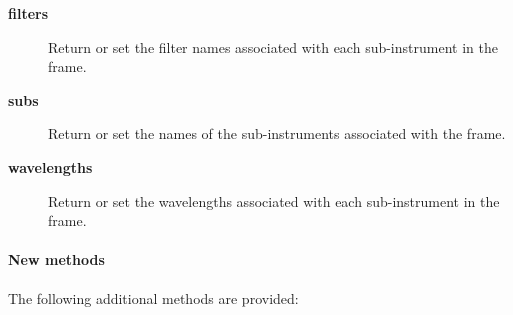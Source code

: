 \begin{description}

\item[{\textbf{filters}}] \mbox{}

Return or set the filter names associated with each sub-instrument
in the frame.


\item[{\textbf{subs}}] \mbox{}

Return or set the names of the sub-instruments associated
with the frame.


\item[{\textbf{wavelengths}}] \mbox{}

Return or set the wavelengths associated with each  sub-instrument
in the frame.

\end{description}
\paragraph*{New methods\label{ORAC::Frame::SCUBA_New_methods}}


The following additional methods are provided:

